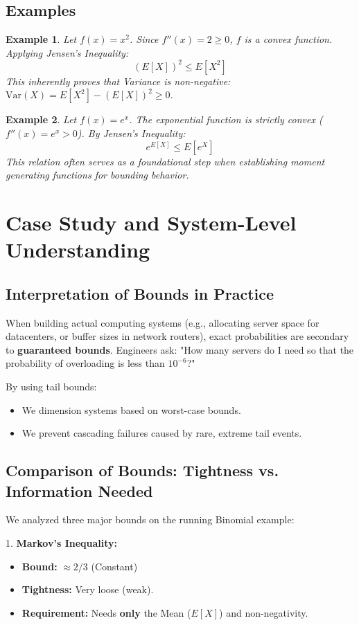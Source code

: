 \documentclass{article}
\newtheorem{example}{Example}
\begin{document}
\subsection{Examples}
\begin{example}
Let $f(x) = x^2$. Since $f''(x) = 2 \ge 0$, $f$ is a convex function.
Applying Jensen's Inequality:
\[ (E[X])^2 \le E[X^2] \]
This inherently proves that Variance is non-negative: $\text{Var}(X) = E[X^2] - (E[X])^2 \ge 0$.
\end{example}

\begin{example}
Let $f(x) = e^x$. The exponential function is strictly convex ($f''(x) = e^x > 0$).
By Jensen's Inequality:
\[ e^{E[X]} \le E[e^X] \]
This relation often serves as a foundational step when establishing moment generating functions for bounding behavior.
\end{example}

\section{Case Study and System-Level Understanding}

\subsection{Interpretation of Bounds in Practice}
When building actual computing systems (e.g., allocating server space for datacenters, or buffer sizes in network routers), exact probabilities are secondary to \textbf{guaranteed bounds}. Engineers ask: "How many servers do I need so that the probability of overloading is less than $10^{-6}$?"

By using tail bounds:
\begin{itemize}
    \item We dimension systems based on worst-case bounds.
    \item We prevent cascading failures caused by rare, extreme tail events.
\end{itemize}

\subsection{Comparison of Bounds: Tightness vs. Information Needed}
We analyzed three major bounds on the running Binomial example:

1. \textbf{Markov's Inequality:}
   \begin{itemize}
       \item \textbf{Bound:} $\approx 2/3$ (Constant)
       \item \textbf{Tightness:} Very loose (weak).
       \item \textbf{Requirement:} Needs \textbf{only} the Mean ($E[X]$) and non-negativity.
   \end{itemize}
\end{document}
